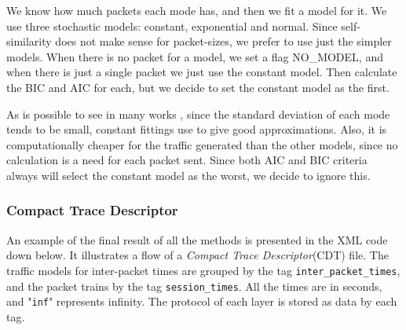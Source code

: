 We know how much packets each mode has, and then we fit a model for it. We use three stochastic models: constant, exponential and normal. Since self-similarity does not make sense for packet-sizes, we prefer to use just the simpler models. When there is no packet for a model, we set a flag NO\_MODEL, and when there is just a single packet we just use the constant model. Then calculate the BIC and AIC for each, but we decide to set the constant model as the first.

As is possible to see in many works \cite{packet-distribution-model} \cite{udp-flows-model}, since the standard deviation of each mode tends to be small, constant fittings use to give good approximations. Also, it is computationally cheaper for the traffic generated than the other models, since no calculation is a need for each packet sent. Since both AIC and BIC criteria always will select the constant model as the worst, we decide to ignore this.


\subsubsection{Compact Trace Descriptor}

An example of the final result of all the methods is presented in the XML code down below. It illustrates a flow of a \textit{Compact Trace Descriptor}(CDT) file. The traffic models for inter-packet times are grouped by the tag \texttt{inter\_packet\_times}, and the packet trains by the tag \texttt{session\_times}. All the times are in seconds, and "\texttt{inf}" represents infinity. The protocol of each layer is stored as data by each tag.

